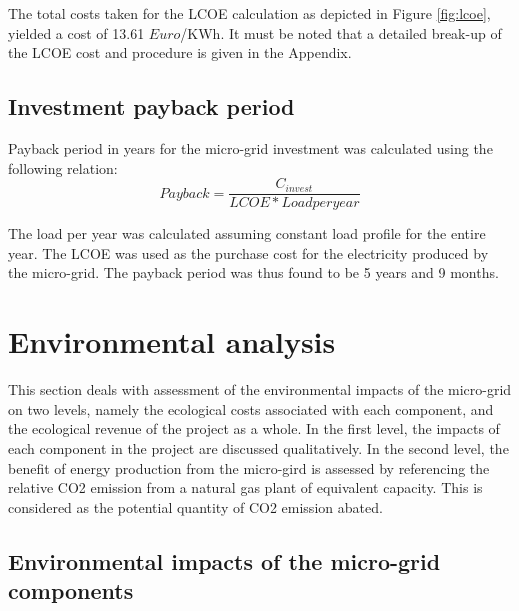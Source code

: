 \noindent The total costs taken for the LCOE calculation as depicted in Figure \ref{fig:lcoe}, yielded a cost of 13.61 $ Euro $/KWh. It must be noted that a detailed break-up of the LCOE cost and procedure is given in the Appendix.

\subsection{Investment payback period}

Payback period in years for the micro-grid investment was calculated using the following relation: 
\begin{equation}
    Payback = \frac{C_{invest}}{LCOE*Load per year}
\end{equation}

\noindent The load per year was calculated assuming constant load profile for the entire year. The LCOE was used as the purchase cost for the electricity produced by the micro-grid. The payback period was thus found to be 5 years and 9 months.


\section{Environmental analysis}
This section deals with assessment of the environmental impacts of the micro-grid on two levels, namely the ecological costs associated with each component, and the ecological revenue of the project as a whole. In the first level, the impacts of each component in the project are discussed qualitatively. In the second level, the benefit of energy production from the micro-gird is assessed by referencing the relative CO2 emission from a natural gas plant of equivalent capacity. This is considered as the potential quantity of CO2 emission abated.

\subsection{Environmental impacts of the micro-grid components}

